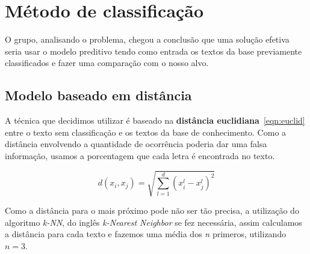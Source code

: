 \section{Método de classificação}
O grupo, analisando o problema, chegou a conclusão que uma solução efetiva seria usar o modelo preditivo tendo como entrada os textos da base previamente classificados e fazer uma comparação com o nosso alvo.

\subsection{Modelo baseado em distância}
A técnica que decidimos utilizar é baseado na \textbf{distância euclidiana}~\ref{eqn:euclid} entre o texto sem classificação e os textos da base de conhecimento. Como a distância envolvendo a quantidade de ocorrência poderia dar uma falsa informação, usamos a porcentagem que cada letra é encontrada no texto.

\[
d(x_i, x_j) = \sqrt{\sum_{l=1}^{d} (x^l_i - x^l_j)^2}
\label{eqn:euclid}
\]

Como a distância para o mais próximo pode não ser tão precisa, a utilização do algoritmo \emph{k-NN}, do inglês \emph{k-Nearest Neighbor} se fez necessária, assim calculamos a distância para cada texto e fazemos uma média dos \emph{n} primeros, utilizando \(n = 3\).

